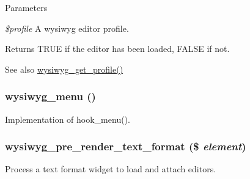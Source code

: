 \begin{DoxyParams}{Parameters}
\item[{\em \$profile}]A wysiwyg editor profile.\end{DoxyParams}
\begin{DoxyReturn}{Returns}
TRUE if the editor has been loaded, FALSE if not.
\end{DoxyReturn}
\begin{DoxySeeAlso}{See also}
\hyperlink{wysiwyg_8module_aa06388aeffb7f00e3b20466dc40f71b5}{wysiwyg\_\-get\_\-profile()} 
\end{DoxySeeAlso}
\hypertarget{wysiwyg_8module_a7bbcb615ff86965ede6de1ebdaf1f360}{
\subsubsection[{wysiwyg\_\-menu}]{\setlength{\rightskip}{0pt plus 5cm}wysiwyg\_\-menu ()}}
\label{wysiwyg_8module_a7bbcb615ff86965ede6de1ebdaf1f360}
Implementation of hook\_\-menu(). \hypertarget{wysiwyg_8module_ad53fe3535b2c8eab8bbbb88ed694af97}{
\subsubsection[{wysiwyg\_\-pre\_\-render\_\-text\_\-format}]{\setlength{\rightskip}{0pt plus 5cm}wysiwyg\_\-pre\_\-render\_\-text\_\-format (\$ {\em element})}}
\label{wysiwyg_8module_ad53fe3535b2c8eab8bbbb88ed694af97}
Process a text format widget to load and attach editors.

